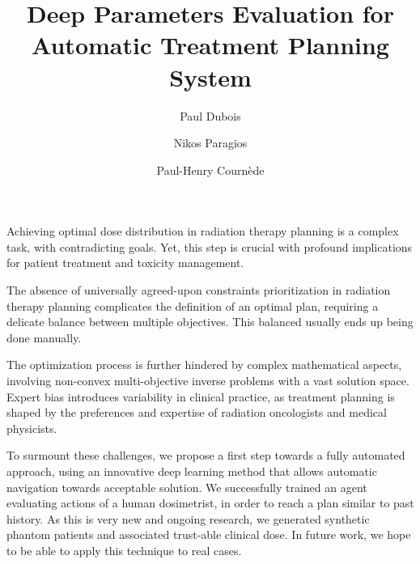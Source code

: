 \documentclass[11pt,twocolumn,twoside]{article}
\begin{document}
\title{Deep Parameters Evaluation for Automatic Treatment Planning System} 

\author[1,2]{Paul Dubois}
\author[1]{Nikos Paragios}
\author[2]{Paul-Henry Cournède}



\maketitle
\thispagestyle{fancy}





\begin{customabstract}
	Achieving optimal dose distribution in radiation therapy planning is a complex task, with contradicting goals.
	Yet, this step is crucial with profound implications for patient treatment and toxicity management.
	
	The absence of universally agreed-upon constraints prioritization in radiation therapy planning complicates the definition of an optimal plan, requiring a delicate balance between multiple objectives.
	This balanced usually ends up being done manually.
	
	The optimization process is further hindered by complex mathematical aspects, involving non-convex multi-objective inverse problems with a vast solution space.
	Expert bias introduces variability in clinical practice, as treatment planning is shaped by the preferences and expertise of radiation oncologists and medical physicists.
	
	To surmount these challenges, we propose a first step towards a fully automated approach, using an innovative deep learning method that allows automatic navigation towards acceptable solution.
	We successfully trained an agent evaluating actions of a human dosimetrist, in order to reach a plan similar to past history.
	As this is very new and ongoing research, we generated synthetic phantom patients and associated trust-able clinical dose.
	In future work, we hope to be able to apply this technique to real cases.
\end{customabstract}
\end{document}
